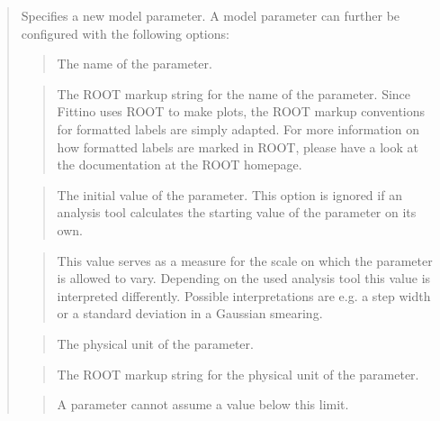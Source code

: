 \documentclass[letterpaper,10pt,english]{sphinxmanual}
\begin{document}
\begin{quote}

Specifies a new model parameter. A model parameter can further be configured with the following
options:

\begin{quote}

The name of the parameter.
\end{quote}

\begin{quote}

The ROOT markup string for the name of the parameter. Since Fittino uses ROOT to make plots,
the ROOT markup conventions for formatted labels are simply adapted. For more information on
how formatted labels are marked in ROOT, please have a look at the documentation at the ROOT
homepage.
\end{quote}

\begin{quote}

The initial value of the parameter. This option is ignored if an analysis tool calculates the
starting value of the parameter on its own.
\end{quote}

\begin{quote}

This value serves as a measure for the scale on which the parameter is allowed to vary.
Depending on the used analysis tool this value is interpreted differently. Possible
interpretations are e.g. a step width or a standard deviation in a Gaussian smearing.
\end{quote}

\begin{quote}

The physical unit of the parameter.
\end{quote}

\begin{quote}

The ROOT markup string for the physical unit of the parameter.
\end{quote}

\begin{quote}

A parameter cannot assume a value below this limit.
\end{quote}


\end{quote}
\end{document}
